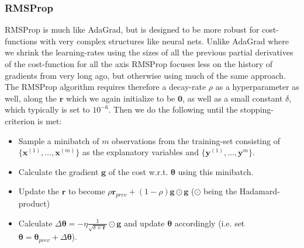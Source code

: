 \documentclass{article}
\begin{document}
\subsubsection{RMSProp}
RMSProp is much like AdaGrad, but is designed to be more robust for
cost-functions with very complex structures like neural nets. Unlike AdaGrad
where we shrink the learning-rates using the sizes of all the previous partial
derivatives of the cost-function for all the axis RMSProp focuses less on the
history of gradients from very long ago, but otherwise using much of the same
approach. The RMSProp algorithm requires therefore a decay-rate $\rho$ as a
hyperparameter as well, along the $\bm{r}$ which we again initialize to be
$\bm{0}$, as well as a small constant $\delta$, which typically is set to
$10^{-6}$. Then we do the following until the stopping-criterion is met:
\begin{itemize}
      \item Sample a minibatch of $m$ observations from the training-set
            consisting of $\{\bm{x}^{(1)}, \dots, \bm{x}^{(m)}\}$ as the explanatory
            variables and $\{\bm{y}^{(1)}, \dots, \bm{y}^{m}\}$.
      \item Calculate the gradient $\bm{g}$ of the cost w.r.t. $\bm{\theta}$ using
            this minibatch.
      \item Update the $\bm{r}$ to become $\rho \bm{r}_{prev} + (1 - \rho) \bm{g} \odot \bm{g}$
            ($\odot$ being the Hadamard-product)
      \item Calculate $\Delta \bm{\theta} = -\eta \frac{1}{\sqrt{\delta + \bm{r}}}
                  \odot \bm{g}$ and update $\bm{\theta}$ accordingly (i.e. set $\bm{\theta} =
                  \bm{\theta}_{prev} + \Delta \bm{\theta}$).
\end{itemize}
\end{document}
